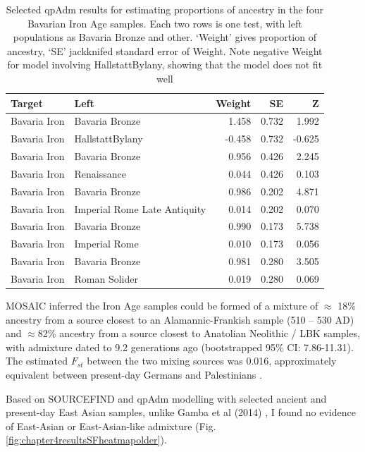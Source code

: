 \begin{table}
\centering
\begin{tabular}[t]{llrrr}
\toprule
Target & Left & Weight & SE & Z\\
\midrule
Bavaria Iron & Bavaria Bronze & 1.458 & 0.732 & 1.992\\
Bavaria Iron & HallstattBylany & -0.458 & 0.732 & -0.625\\
\addlinespace
Bavaria Iron & Bavaria Bronze & 0.956 & 0.426 & 2.245\\
Bavaria Iron & Renaissance & 0.044 & 0.426 & 0.103\\
\addlinespace
Bavaria Iron & Bavaria Bronze & 0.986 & 0.202 & 4.871\\
Bavaria Iron & Imperial Rome Late Antiquity & 0.014 & 0.202 & 0.070\\
\addlinespace
Bavaria Iron & Bavaria Bronze & 0.990 & 0.173 & 5.738\\
Bavaria Iron & Imperial Rome & 0.010 & 0.173 & 0.056\\
\addlinespace
Bavaria Iron & Bavaria Bronze & 0.981 & 0.280 & 3.505\\
Bavaria Iron & Roman Solider & 0.019 & 0.280 & 0.069\\
\bottomrule
\end{tabular}
\caption{Selected qpAdm results for estimating proportions of ancestry in the four Bavarian Iron Age samples. Each two rows is one test, with left populations as Bavaria Bronze and other. `Weight' gives proportion of ancestry, `SE' jackknifed standard error of Weight. Note negative Weight for model involving  HallstattBylany, showing that the model does not fit well}
\label{tab:IronAge_qpAdm}
\end{table}


MOSAIC inferred the Iron Age samples could be formed of a mixture of $\approx$ 18\% ancestry from a source closest to an Alamannic-Frankish sample (510 – 530 AD) and $\approx$82\% ancestry from a source closest to Anatolian Neolithic / LBK samples, with admixture dated to 9.2 generations ago (bootstrapped 95\% CI: 7.86-11.31). The estimated $F_{st}$ between the two mixing sources was 0.016, approximately equivalent between present-day Germans and Palestinians \cite{nelis2009genetic}.  


Based on SOURCEFIND and qpAdm modelling with selected ancient and present-day East Asian samples, unlike Gamba et al (2014) \cite{Gamba2014}, I found no evidence of East-Asian or East-Asian-like admixture (Fig. \ref{fig:chapter4resultsSFheatmapolder}).


